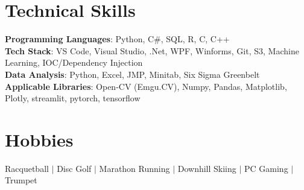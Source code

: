 \documentclass[letterpaper,11pt]{article}
\begin{document}
\section{Technical Skills}
 \begin{itemize}[leftmargin=0.15in, label={}]
    \small{\item{
     \textbf{Programming Languages}{: Python, C\#, SQL, R, C, C++} \\
     \textbf{Tech Stack}{: VS Code, Visual Studio, .Net, WPF, Winforms, Git, S3, Machine Learning, IOC/Dependency Injection} \\
     \textbf{Data Analysis}{:  Python, Excel, JMP, Minitab, Six Sigma Greenbelt} \\
     \textbf{Applicable Libraries}{: Open-CV (Emgu.CV), Numpy, Pandas, Matplotlib, Plotly, streamlit, pytorch, tensorflow} \\
    }}
 \end{itemize}
 \vspace{-16pt}

 \section{Hobbies}
Racquetball $|$ Disc Golf $|$ Marathon Running $|$ Downhill Skiing $|$ PC Gaming $|$ Trumpet 
\end{document}
